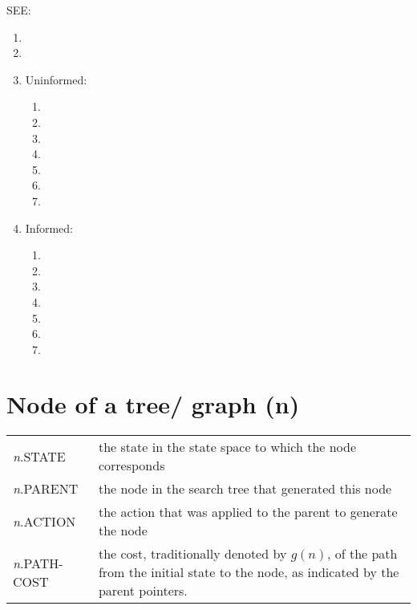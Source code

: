 SEE:
\begin{enumerate}
    \item {}
    \item {}
    
    \item Uninformed:
    \begin{enumerate}
        \item {}
        \item {}
        \item {}
        \item {}
        \item {}
        \item {}
        \item {}
    \end{enumerate}
    
    \item Informed:
    \begin{enumerate}
        \item {}
        \item {}
        \item {}
        \item {}
        \item {}
        \item {}
        \item {}
    \end{enumerate}
\end{enumerate}


\section{Node of a tree/ graph (n)}
\begin{table}[H]
    \centering
    \begin{tabular}{l p{8cm}}
        \textit{n}.STATE & the state in the state space to which the node corresponds \\
        
        \textit{n}.PARENT & the node in the search tree that generated this node\\
        
        \textit{n}.ACTION &  the action that was applied to the parent to generate the node \\
        
        \textit{n}.PATH-COST & the cost, traditionally denoted by $g(n)$, of the path from the initial state to the node, as indicated by the parent pointers.
    \end{tabular}
\end{table}


